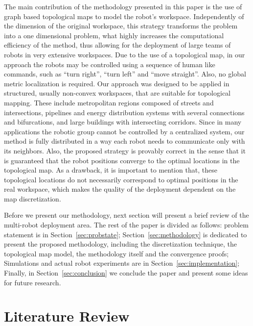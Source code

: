 \documentclass[smallcondensed]{svjour3}
\begin{document}
The main contribution of the methodology presented in this paper is the use of graph based topological maps to model the robot's workspace. Independently of the dimension of the original workspace, this strategy transforms the problem into a one dimensional problem, what highly increases the computational efficiency of the method, thus allowing for the deployment of large teams of robots in very extensive workspaces. Due to the use of a topological map, in our approach the robots may be controlled using a sequence of human like commands, such as ``turn right'', ``turn left'' and ``move straight''. Also, no global metric localization is required. Our approach  was designed to be applied in structured, usually non-convex workspaces, that are suitable for topological mapping. These include metropolitan regions composed of streets and intersections, pi\-pe\-lines and energy distribution systems with several connections and bifurcations, and large buildings with intersecting corridors. Since in many applications the robotic group cannot be controlled by a centralized system, our method is fully distributed  in a way each robot needs to communicate only with its neighbors. Also, the proposed strategy is provably correct in the sense that it is guaranteed that the robot positions converge to the optimal locations in the topological map. As a drawback, it is important to mention that, these topological locations do not necessarily correspond to optimal positions in the real workspace, which makes the quality of the deployment dependent on the map discretization. 

Before we present our methodology, next section will present a brief review of the multi-robot deployment area. The rest of the paper is divided as follows: problem statement is in Section~\ref{sec:probstate}; Section~\ref{sec:methodology} is dedicated to present the proposed methodology, including the discretization technique, the topological map model, the methodology itself and the convergence proofs; Simulations and actual robot experiments are in Section~\ref{sec:implementation}; Finally, in Section~\ref{sec:conclusion} we conclude the paper and present some ideas for future research.

\section{Literature Review}

\end{document}
